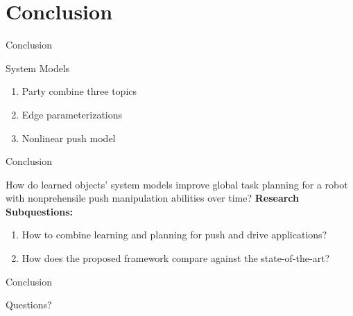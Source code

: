 \section{Conclusion}

\begin{frame}[fragile]{Conclusion}
  \begin{block}{System Models}
  \begin{enumerate}
    \item Party combine three topics\pause
    \item Edge parameterizations\pause
    \item Nonlinear push model
  \end{enumerate}
  \end{block}
\end{frame}

\begin{frame}[fragile]{Conclusion}

How do learned objects' system models improve global task planning for a robot with nonprehensile push manipulation abilities over time? \bs
\textbf{Research Subquestions:}

\begin{enumerate}
    \item\small How to combine learning and planning for push and drive applications?
    \item\small How does the proposed framework compare against the state-of-the-art?
\end{enumerate}
\end{frame}

\begin{frame}[fragile]{Conclusion}
\begin{center}
    Questions?
\end{center}
\end{frame}
